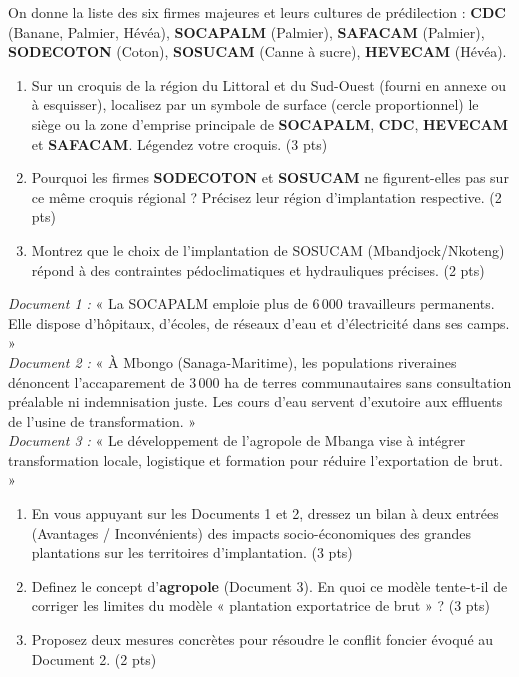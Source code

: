 \documentclass[11pt]{article}
\begin{document}
\begin{exercice}
\noindent On donne la liste des six firmes majeures et leurs cultures de prédilection : \textbf{CDC} (Banane, Palmier, Hévéa), \textbf{SOCAPALM} (Palmier), \textbf{SAFACAM} (Palmier), \textbf{SODECOTON} (Coton), \textbf{SOSUCAM} (Canne à sucre), \textbf{HEVECAM} (Hévéa).

\begin{enumerate}
    \item Sur un croquis de la région du Littoral et du Sud-Ouest (fourni en annexe ou à esquisser), localisez par un symbole de surface (cercle proportionnel) le siège ou la zone d'emprise principale de \textbf{SOCAPALM}, \textbf{CDC}, \textbf{HEVECAM} et \textbf{SAFACAM}. Légendez votre croquis. \hfill (3 pts)
    \item Pourquoi les firmes \textbf{SODECOTON} et \textbf{SOSUCAM} ne figurent-elles pas sur ce même croquis régional ? Précisez leur région d'implantation respective. \hfill (2 pts)
    \item Montrez que le choix de l'implantation de SOSUCAM (Mbandjock/Nkoteng) répond à des contraintes pédoclimatiques et hydrauliques précises. \hfill (2 pts)
\end{enumerate}
\end{exercice}

\begin{exercice}
\noindent \textit{Document 1 :} « La SOCAPALM emploie plus de 6\,000 travailleurs permanents. Elle dispose d'hôpitaux, d'écoles, de réseaux d'eau et d'électricité dans ses camps. »\\
\textit{Document 2 :} « À Mbongo (Sanaga-Maritime), les populations riveraines dénoncent l'accaparement de 3\,000 ha de terres communautaires sans consultation préalable ni indemnisation juste. Les cours d'eau servent d'exutoire aux effluents de l'usine de transformation. »\\
\textit{Document 3 :} « Le développement de l'agropole de Mbanga vise à intégrer transformation locale, logistique et formation pour réduire l'exportation de brut. »

\begin{enumerate}
    \item En vous appuyant sur les Documents 1 et 2, dressez un bilan à deux entrées (Avantages / Inconvénients) des impacts socio-économiques des grandes plantations sur les territoires d'implantation. \hfill (3 pts)
    \item Definez le concept d'\textbf{agropole} (Document 3). En quoi ce modèle tente-t-il de corriger les limites du modèle « plantation exportatrice de brut » ? \hfill (3 pts)
    \item Proposez deux mesures concrètes pour résoudre le conflit foncier évoqué au Document 2. \hfill (2 pts)
\end{enumerate}
\end{exercice}
\end{document}
